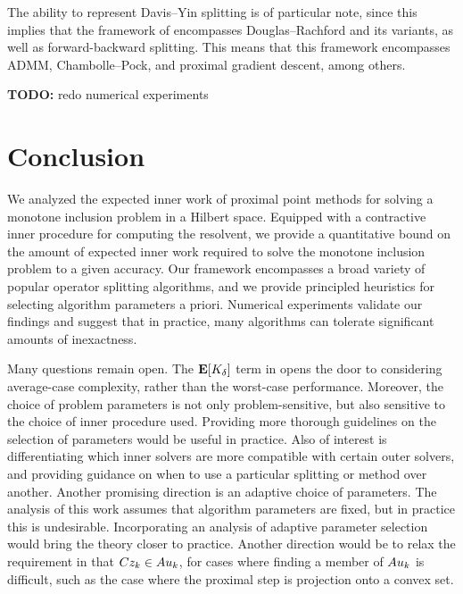 \documentclass[11pt]{article}
\newcommand{\TODO}[1]{{\color{purple}\textbf{TODO:} #1}}
\begin{document}
The ability to represent Davis--Yin splitting is of particular note, since this implies that the framework of \citet{alves2025generalframeworkinexactsplitting,bredies2021degeneratepreconditionedproximalpoint} encompasses Douglas--Rachford and its variants, as well as forward-backward splitting.
This means that this framework encompasses ADMM, Chambolle--Pock, and proximal gradient descent, among others.


\TODO{redo numerical experiments}

\section{Conclusion}
We analyzed the expected inner work of proximal point methods for solving a monotone inclusion problem in a Hilbert space.
Equipped with a contractive inner procedure for computing the resolvent, we provide a quantitative bound on the amount of expected inner work required to solve the monotone inclusion problem to a given accuracy.
Our framework encompasses a broad variety of popular operator splitting algorithms, and we provide principled heuristics for selecting algorithm parameters a priori.
Numerical experiments validate our findings and suggest that in practice, many algorithms can tolerate significant amounts of inexactness.

Many questions remain open.
The ${\bf E{}}[K_\delta]$ term in  opens the door to considering average-case complexity, rather than the worst-case performance.
Moreover, the choice of problem parameters is not only problem-sensitive, but also sensitive to the choice of inner procedure used.
Providing more thorough guidelines on the selection of parameters would be useful in practice.
Also of interest is differentiating which inner solvers are more compatible with certain outer solvers, and providing guidance on when to use a particular splitting or method over another.
Another promising direction is an adaptive choice of parameters.
The analysis of this work assumes that algorithm parameters are fixed, but in practice this is undesirable.
Incorporating an analysis of adaptive parameter selection would bring the theory closer to practice.
Another direction would be to relax the requirement in  that ${C} z_k \in{A} u_k$, for cases where finding a member of ${A} u_k$ is difficult, such as the case where the proximal step is projection onto a convex set.

\printbibliography
\end{document}
